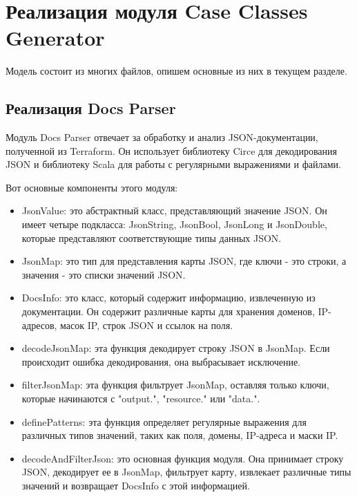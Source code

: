   \section{Реализация модуля Case Classes Generator}

  Модель состоит из многих файлов, опишем основные из них в текущем разделе.

  \subsection{Реализация Docs Parser}

  Модуль Docs Parser отвечает за обработку и анализ JSON-документации,
полученной
  из Terraform. Он использует библиотеку Circe для декодирования JSON и
библиотеку
  Scala для работы с регулярными выражениями и файлами.

  Вот основные компоненты этого модуля:

  \begin{itemize}
    \item JsonValue: это абстрактный класс, представляющий значение JSON. Он
имеет
  четыре
  подкласса: JsonString, JsonBool, JsonLong и JsonDouble, которые представляют
  соответствующие типы данных JSON.

    \item JsonMap: это тип для представления карты JSON, где ключи - это строки,
а
  значения - это списки значений JSON.

    \item DocsInfo: это класс, который содержит информацию, извлеченную из
  документации.
  Он содержит различные карты для хранения доменов, IP-адресов, масок IP, строк
  JSON и ссылок на поля.

    \item decodeJsonMap: эта функция декодирует строку JSON в JsonMap. Если
  происходит
  ошибка декодирования, она выбрасывает исключение.

    \item filterJsonMap: эта функция фильтрует JsonMap, оставляя только ключи,
  которые
  начинаются с "output.", "resource." или "data.".

    \item definePatterns: эта функция определяет регулярные выражения для
  различных типов
  значений, таких как поля, домены, IP-адреса и маски IP.

    \item decodeAndFilterJson: это основная функция модуля. Она принимает строку
  JSON,
  декодирует ее в JsonMap, фильтрует карту, извлекает различные типы значений и
  возвращает DocsInfo с этой информацией.
  \end{itemize}


